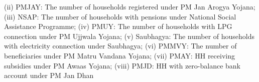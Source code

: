 \begin{table}[!htbp]
\begin{threeparttable}
\begin{tablenotes}[flushleft]
                   (ii) PMJAY: The number of households registered under PM Jan Arogya Yojana;
                   (iii) NSAP: The number of households with pensions under National Social Assistance Programme;
                   (iv) PMUY: The number of households with LPG connection under PM Ujjwala Yojana;
                   (v) Saubhagya: The number of households with electricity connection under Saubhagya;
                   (vi) PMMVY: The number of beneficiaries under PM Matru Vandana Yojana;
                   (vii) PMAY: HH receiving subsidies under PM Awaas Yojana;
                   (viii) PMJD: HH with zero-balance bank account under PM Jan Dhan
\end{tablenotes}
\end{threeparttable}
\end{table}
